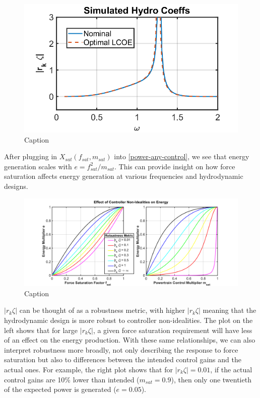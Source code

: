 \documentclass{ifacconf}
\begin{document}
\begin{figure}[h]
    \centering
    \includegraphics[width=\linewidth]{rk_zeta_vs_omega.png}
    \caption{Caption}
    \label{fig:r-k-zeta-vs-freq}
\end{figure}

After plugging in $X_{sat}(f_{sat},m_{sat})$ into \eqref{power-any-control}, we see that energy generation scales with $e = f_{sat}^2/m_{sat}$. This can provide insight on how force saturation affects energy generation at various frequencies and hydrodynamic designs.
\begin{figure}[!hbt]
    \centering
    \includegraphics[width=\linewidth]{saturation-rk-zeta-2.png}
    \caption{Caption}
    \label{fig:my_label}
\end{figure}

$|r_k \zeta|$ can be thought of as a robustness metric, with higher $|r_k \zeta|$ meaning that the hydrodynamic design is more robust to controller non-idealities. The plot on the left shows that for large $|r_k \zeta|$, a given force saturation requirement will have less of an effect on the energy production. With these same relationships, we can also interpret robustness more broadly, not only describing the response to force saturation but also to differences between the intended control gains and the actual ones. For example, the right plot shows that for $|r_k \zeta| = 0.01$, if the actual control gains are 10\% lower than intended ($m_{sat} = 0.9$), then only one twentieth of the expected power is generated ($e = 0.05$).
\end{document}

